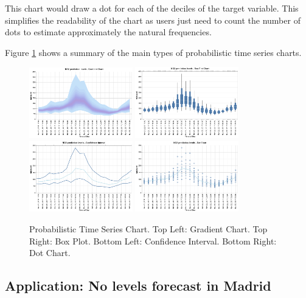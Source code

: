 \documentclass[a4paper,3p,sort&compress]{elsarticle}
\begin{document}
This chart would draw a dot for each of the deciles of the target variable. This simplifies the readability of the chart as
users just need to count the number of dots to estimate approximately the natural frequencies.

Figure \ref{figure:charts} shows a summary of the main types of probabilistic time series charts.

\begin{figure}
  \centering
  \includegraphics[width=0.4\textwidth]{gradient} 
  \includegraphics[width=0.4\textwidth]{boxplot}
  \includegraphics[width=0.4\textwidth]{ci} 
  \includegraphics[width=0.4\textwidth]{dot}
  \caption{\label{figure:charts} Probabilistic Time Series Chart. 
  Top Left: Gradient Chart. Top Right: Box Plot. 
  Bottom Left: Confidence Interval. Bottom Right: Dot Chart.  }
\end{figure}

\subsection{Application: No levels forecast in Madrid}
\end{document}
